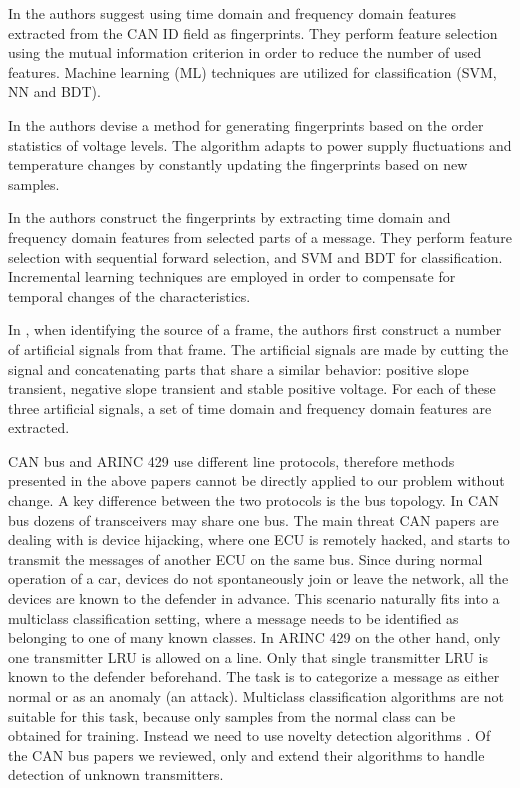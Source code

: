 \documentclass[conference]{IEEEtran}
\begin{document}
  In \cite{choi2018identifying} the authors suggest using time domain and frequency domain features extracted from the CAN ID field as fingerprints. They perform feature selection using the mutual information criterion in order to reduce the number of used features. Machine learning (ML) techniques are utilized for classification (SVM, NN and BDT).
  
  In \cite{cho2017viden} the authors devise a method for generating fingerprints based on the order statistics of voltage levels. The algorithm adapts to power supply fluctuations and temperature changes by constantly updating the fingerprints based on new samples.
  
  In \cite{choi2018voltageids} the authors construct the fingerprints by extracting time domain and frequency domain features from selected parts of a message. They perform feature selection with sequential forward selection, and SVM and BDT for classification. Incremental learning techniques \cite{diehl2003svm} are employed in order to compensate for temporal changes of the characteristics.
  
  In \cite{kneib2018scission}, when identifying the source of a frame, the authors first construct a number of artificial signals from that frame. The artificial signals are made by cutting the signal and concatenating parts that share a similar behavior: positive slope transient, negative slope transient and stable positive voltage. For each of these three artificial signals, a set of time domain and frequency domain features are extracted.
  
  CAN bus and ARINC 429 use different line protocols, therefore methods presented in the above papers cannot be directly applied to our problem without change. A key difference between the two protocols is the bus topology. In CAN bus dozens of transceivers may share one bus. The main threat CAN papers are dealing with is device hijacking, where one ECU is remotely hacked, and starts to transmit the messages of another ECU on the same bus. Since during normal operation of a car, devices do not spontaneously join or leave the network, all the devices are known to the defender in advance. This scenario naturally fits into a multiclass classification setting, where a message needs to be identified as belonging to one of many known classes. In ARINC 429 on the other hand, only one transmitter LRU is allowed on a line. Only that single transmitter LRU is known to the defender beforehand. The task is to categorize a message as either normal or as an anomaly (an attack). Multiclass classification algorithms are not suitable for this task, because only samples from the normal class can be obtained for training. Instead we need to use novelty detection algorithms \cite{pimentel2014review}. Of the CAN bus papers we reviewed, only \cite{choi2018identifying} and \cite{choi2018voltageids} extend their algorithms to handle detection of unknown transmitters.
  
\end{document}
